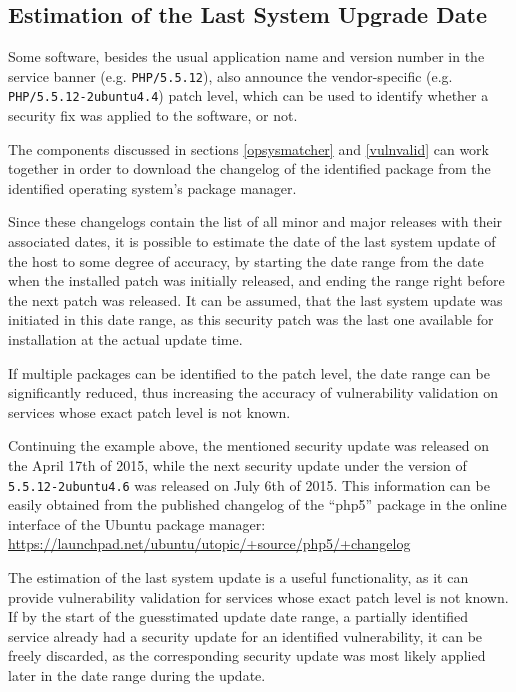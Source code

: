 \documentclass[a4paper,12pt]{article}
\begin{document}
\subsection{Estimation of the Last System Upgrade Date}
 

	Some software, besides the usual application name and version number in the service banner (e.g. \texttt{PHP/5.5.12}), also announce the vendor-specific (e.g. \texttt{PHP/5.5.12-2ubuntu4.4}) patch level, which can be used to identify whether a security fix was applied to the software, or not.
	
	The components discussed in sections \ref{opsysmatcher} and \ref{vulnvalid} can work together in order to download the changelog of the identified package from the identified operating system's package manager.
	
	Since these changelogs contain the list of all minor and major releases with their associated dates, it is possible to estimate the date of the last system update of the host to some degree of accuracy, by starting the date range from the date when the installed patch was initially released, and ending the range right before the next patch was released. It can be assumed, that the last system update was initiated in this date range, as this security patch was the last one available for installation at the actual update time.
	
	If multiple packages can be identified to the patch level, the date range can be significantly reduced, thus increasing the accuracy of vulnerability validation on services whose exact patch level is not known.
	
	Continuing the example above, the mentioned security update was released on the April 17th of 2015, while the next security update under the version of \texttt{5.5.12-2ubuntu4.6} was released on July 6th of 2015. This information can be easily obtained from the published changelog of the ``php5'' package in the online interface of the Ubuntu package manager: \url{https://launchpad.net/ubuntu/utopic/+source/php5/+changelog}
	
	The estimation of the last system update is a useful functionality, as it can provide vulnerability validation for services whose exact patch level is not known. If by the start of the guesstimated update date range, a partially identified service already had a security update for an identified vulnerability, it can be freely discarded, as the corresponding security update was most likely applied later in the date range during the update.
	
\end{document}
